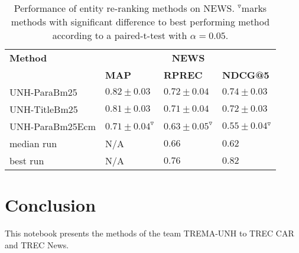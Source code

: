 \documentclass{article}
\begin{document}

\begin{table}
\centering \caption{Performance of entity re-ranking methods on NEWS. $^{\triangledown}$marks
methods with significant difference to best performing method according
to a paired-t-test with $\alpha=0.05$.\label{tab:news-results}}
\begin{center}
\begin{tabular}{llll}
\toprule 
\textbf{Method}  & \multicolumn{3}{c}{\textbf{NEWS}}\tabularnewline
\cmidrule(lr){2-4}  & \textbf{MAP}  & \textbf{RPREC}  & \textbf{NDCG@5} \tabularnewline
\midrule 
UNH-ParaBm25 & $0.82\pm0.03$ & $0.72\pm0.04$ & $0.74\pm0.03$\tabularnewline
UNH-TitleBm25 & $0.81\pm0.03$ & $0.71\pm0.04$ & $0.72\pm0.03$\tabularnewline
UNH-ParaBm25Ecm & $0.71\pm0.04^{\triangledown}$ & $0.63\pm0.05^{\triangledown}$ & $0.55\pm0.04{}^{\triangledown}$\tabularnewline
\midrule
median run & N/A & $0.66$ & $0.62$\tabularnewline
best run & N/A & $0.76$ & $0.82$\tabularnewline
\bottomrule
\end{tabular}
\end{center}
\end{table}






\section{Conclusion}

This notebook presents the methods of the team TREMA-UNH to TREC CAR and TREC News. 





\end{document}

